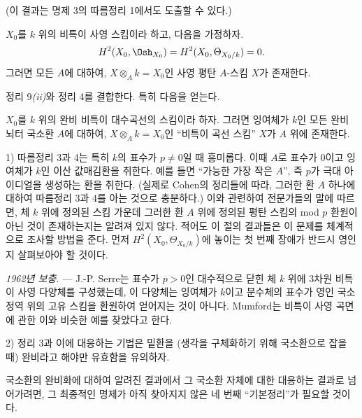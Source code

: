 (이 결과는 명제 3의 따름정리 1에서도 도출할 수 있다.)

 $X_0$를 $k$ 위의 비특이 사영 스킴이라 하고,
다음을 가정하자.
\[
  H^2(X_0,\Osh_{X_0})=H^2(X_0,\Theta_{X_0/k})=0.
\]
그러면 모든 $A$에 대하여, $X\otimes_A k=X_0$인 사영
평탄 $A$-스킴 $X$가 존재한다.

정리 9\textit{(ii)}와 정리 4를 결합한다. 특히 다음을 얻는다.

 $X_0$를 $k$ 위의 완비 비특이 대수곡선의
스킴이라 하자. 그러면 잉여체가 $k$인 모든 완비 뇌터 국소환 $A$에 대하여,
$X\otimes_A k=X_0$인 ``비특이 곡선 스킴'' $X$가 $A$ 위에 존재한다.


1) 따름정리 3과 4는 특히 $k$의 표수가
$p\ne0$일 때 흥미롭다. 이때 $A$로 표수가 $0$이고 잉여체가 $k$인
이산 값매김환을 취한다. 예를 들면 ``가능한 가장 작은 $A$'',
즉 $p$가 극대 아이디얼을 생성하는 환을 취한다. (실제로
Cohen의 정리들에 따라, 그러한 환 $A$ 하나에 대하여 따름정리 3과 4를
아는 것으로 충분하다.) 이와 관련하여 전문가들의 말에 따르면,
체 $k$ 위에 정의된 스킴 가운데 그러한 환 $A$ 위에 정의된 평탄 스킴의
mod $p$ 환원이 아닌 것이 존재하는지는 알려져 있지 않다. 적어도 이 절의 결과들은
이 문제를 체계적으로 조사할 방법을 준다. 먼저
$H^2(X_0,\Theta_{X_0/k})$에 놓이는 첫 번째 장애가
반드시 영인지 살펴보아야 할 것이다.

\emph{1962년 보충.} --- J.-P. Serre는 표수가 $p>0$인 대수적으로
닫힌 체 $k$ 위에 3차원 비특이 사영 다양체를 구성했는데, 이 다양체는
잉여체가 $k$이고 분수체의 표수가 영인 국소 정역 위의 고유 스킴을
환원하여 얻어지는 것이 아니다. Mumford는 비특이 사영 곡면에 관한
이와 비슷한 예를 찾았다고 한다.

2) 정리 3과 이에 대응하는 기법은 밑환을 (생각을 구체화하기 위해 국소환으로
잡을 때) 완비라고 해야만 유효함을 유의하자.

국소환의 완비화에 대하여 알려진 결과에서 그 국소환 자체에 대한
대응하는 결과로 넘어가려면, 그 최종적인 명제가 아직 찾아지지 않은
네 번째 ``기본정리''가 필요할 것이다.

